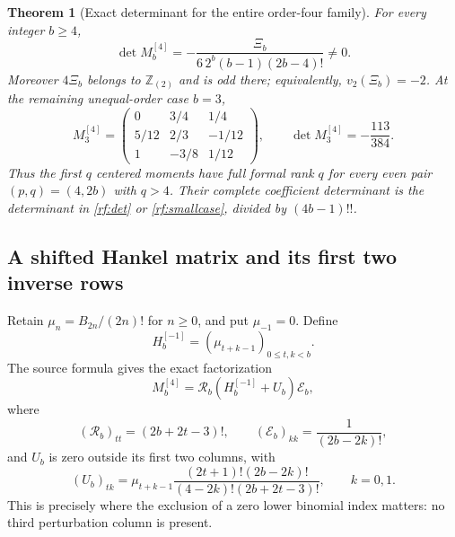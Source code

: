 \documentclass[11pt,a4paper]{article}
\numberwithin{equation}{section}
\theoremstyle{plain}
\newtheorem{theorem}{Theorem}[section]
\theoremstyle{definition}
\theoremstyle{remark}
\begin{document}
\begin{theorem}[Exact determinant for the entire order-four family]
\label{rf:main}
For every integer $b\geq4$,
\begin{equation}\label{rf:det}
 \boxed{\displaystyle
 \det M_b^{[4]}=-\frac{\Xi_b}
      {6\,2^b(b-1)(2b-4)!}\ne0.}
\end{equation}
Moreover $4\Xi_b$ belongs to $\mathbb Z_{(2)}$ and is odd there;
equivalently, $v_2(\Xi_b)=-2$.  At the remaining unequal-order
case $b=3$,
\begin{equation}\label{rf:smallcase}
 M_3^{[4]}=
 \begin{pmatrix}
 0&3/4&1/4\\5/12&2/3&-1/12\\1&-3/8&1/12
 \end{pmatrix},\qquad
 \det M_3^{[4]}=-\frac{113}{384}.
\end{equation}
Thus the first $q$ centered moments have full formal rank $q$
for every even pair $(p,q)=(4,2b)$ with $q>4$.  Their complete
coefficient determinant is the determinant in
\eqref{rf:det} or \eqref{rf:smallcase}, divided by $(4b-1)!!$.
\end{theorem}

\subsection{A shifted Hankel matrix and its first two inverse rows}

Retain $\mu_n=B_{2n}/(2n)!$ for $n\geq0$, and put $\mu_{-1}=0$.
Define
\[
 H_b^{[-1]}=(\mu_{t+k-1})_{0\leq t,k<b}.
\]
The source formula gives the exact factorization
\begin{equation}\label{rf:factorization}
 M_b^{[4]}=\mathcal R_b(H_b^{[-1]}+U_b)\mathcal E_b,
\end{equation}
where
\[
 (\mathcal R_b)_{tt}=(2b+2t-3)!,\qquad
 (\mathcal E_b)_{kk}=\frac1{(2b-2k)!},
\]
and $U_b$ is zero outside its first two columns, with
\begin{equation}\label{rf:U}
 (U_b)_{tk}=\mu_{t+k-1}
  \frac{(2t+1)!(2b-2k)!}
       {(4-2k)!(2b+2t-3)!},\qquad k=0,1.
\end{equation}
This is precisely where the exclusion of a zero lower binomial
index matters: no third perturbation column is present.
\end{document}
